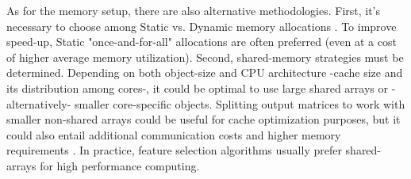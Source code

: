 \documentclass{juliacon}
\begin{document}
As for the memory setup, there are also alternative methodologies. First, it's necessary to choose among Static vs. Dynamic memory allocations \cite{prajapati2015}. To improve speed-up, Static "once-and-for-all" allocations are often preferred (even at a cost of higher average memory utilization). Second, shared-memory strategies must be determined. Depending on both object-size and CPU architecture -cache size and its distribution among cores-, it could be optimal to use large shared arrays or -alternatively- smaller core-specific objects. Splitting output matrices to work with smaller non-shared arrays could be useful for cache optimization purposes, but it could also entail additional communication costs and higher memory requirements \cite{ahmed2015}. In practice, feature selection algorithms usually prefer shared-arrays for high performance computing. \vskip 6pt



\end{document}

